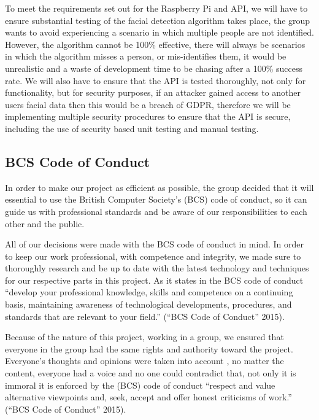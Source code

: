 \documentclass[
  english,
  a4paper,
,tablecaptionabove
]{scrartcl}
\begin{document}
To meet the requirements set out for the Raspberry Pi and API, we will
have to ensure substantial testing of the facial detection algorithm
takes place, the group wants to avoid experiencing a scenario in which
multiple people are not identified. However, the algorithm cannot be
100\% effective, there will always be scenarios in which the algorithm
misses a person, or mis-identifies them, it would be unrealistic and a
waste of development time to be chasing after a 100\% success rate. We
will also have to ensure that the API is tested thoroughly, not only for
functionality, but for security purposes, if an attacker gained access
to another users facial data then this would be a breach of GDPR,
therefore we will be implementing multiple security procedures to ensure
that the API is secure, including the use of security based unit testing
and manual testing.

\hypertarget{bcs-code-of-conduct}{%
\subsection{BCS Code of Conduct}\label{bcs-code-of-conduct}}

In order to make our project as efficient as possible, the group decided
that it will essential to use the British Computer Society's (BCS) code
of conduct, so it can guide us with professional standards and be aware
of our responsibilities to each other and the public.

All of our decisions were made with the BCS code of conduct in mind. In
order to keep our work professional, with competence and integrity, we
made sure to thoroughly research and be up to date with the latest
technology and techniques for our respective parts in this project. As
it states in the BCS code of conduct \enquote{develop your professional
knowledge, skills and competence on a continuing basis, maintaining
awareness of technological developments, procedures, and standards that
are relevant to your field.} (``BCS Code of Conduct'' 2015).

Because of the nature of this project, working in a group, we ensured
that everyone in the group had the same rights and authority toward the
project. Everyone's thoughts and opinions were taken into account , no
matter the content, everyone had a voice and no one could contradict
that, not only it is immoral it is enforced by the (BCS) code of conduct
\enquote{respect and value alternative viewpoints and, seek, accept and
offer honest criticisms of work.} (``BCS Code of Conduct'' 2015).
\end{document}
